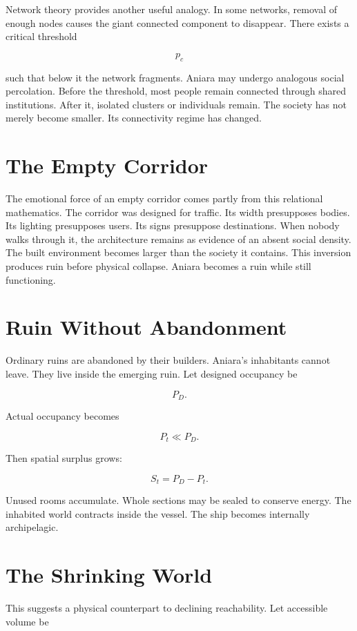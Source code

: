\documentclass[11pt,oneside]{book}
\theoremstyle{definition}
\theoremstyle{remark}
\begin{document}
Network theory provides another useful analogy. In some networks, removal of enough nodes causes the
giant connected component to disappear. There exists a critical threshold

\[
p_c
\]

such that below it the network fragments. Aniara may undergo analogous social percolation. Before
the threshold, most people remain connected through shared institutions. After it, isolated clusters
or individuals remain. The society has not merely become smaller. Its connectivity regime has
changed.

\section{The Empty Corridor}

The emotional force of an empty corridor comes partly from this relational mathematics. The corridor
was designed for traffic. Its width presupposes bodies. Its lighting presupposes users. Its signs
presuppose destinations. When nobody walks through it, the architecture remains as evidence of an
absent social density. The built environment becomes larger than the society it contains. This
inversion produces ruin before physical collapse. Aniara becomes a ruin while still functioning.

\section{Ruin Without Abandonment}

Ordinary ruins are abandoned by their builders. Aniara's inhabitants cannot leave. They live inside
the emerging ruin. Let designed occupancy be

\[
P_D.
\]

Actual occupancy becomes

\[
P_t\ll P_D.
\]

Then spatial surplus grows:

\[
S_t=P_D-P_t.
\]

Unused rooms accumulate. Whole sections may be sealed to conserve energy. The inhabited world
contracts inside the vessel. The ship becomes internally archipelagic.

\section{The Shrinking World}

This suggests a physical counterpart to declining reachability. Let accessible volume be
\end{document}
